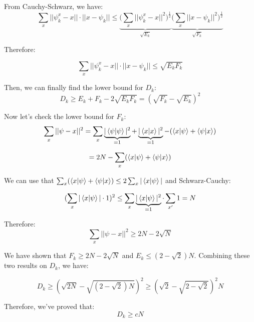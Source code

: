 From Cauchy-Schwarz, we have:
\begin{equation}
    \sum_x || \psi_k^x - x || \cdot || x - \psi_k || \leq \underbrace{\bigg( \sum_x || \psi_k^x - x||^2 \bigg)^{\frac{1}{2}}}_{\sqrt{E_k}} \underbrace{\bigg( \sum_x || x - \psi_k ||^2 \bigg)^{\frac{1}{2}}}_{\sqrt{F_k}}
\end{equation}

Therefore: 

\begin{equation}
    \sum_x || \psi_k^x - x || \cdot || x - \psi_k || \leq \sqrt{E_k F_k}
\end{equation}

Then, we can finally find the lower bound for $D_k$:
\begin{equation}
    D_k \geq E_k + F_k - 2 \sqrt{E_k F_k} = (\sqrt{F_k} - \sqrt{E_k})^2
\end{equation}

Now let's check the lower bound for $F_k$:
\begin{equation}
    \sum_x|| \psi - x ||^2 = \sum_x \underbrace{|\left\langle{\psi}\middle\vert{\psi}\right\rangle|^2}_{=1} + \underbrace{|\left\langle{x}\middle\vert{x}\right\rangle|^2}_{=1} - ( \left\langle{x}\middle\vert{\psi}\right\rangle + \left\langle{\psi}\middle\vert{x}\right\rangle)
\end{equation}

\begin{equation}
    = 2N - \sum_x ( \left\langle{x}\middle\vert{\psi}\right\rangle + \left\langle{\psi}\middle\vert{x}\right\rangle)
\end{equation}

We can use that $\sum_x ( \left\langle{x}\middle\vert{\psi}\right\rangle + \left\langle{\psi}\middle\vert{x}\right\rangle) \leq 2 \sum_x |\left\langle{x}\middle\vert{\psi}\right\rangle|$ and Schwarz-Cauchy:

\begin{equation}
    (\sum_x |\left\langle{x}\middle\vert{\psi}\right\rangle| \cdot 1)^2 \leq \sum_x \underbrace{|\left\langle{x}\middle\vert{\psi}\right\rangle|^2}_{=1} \cdot \sum_{x'}1 = N
\end{equation}

Therefore:
\begin{equation}
    \sum_x || \psi - x ||^2 \geq 2N - 2 \sqrt{N}
\end{equation}

We have shown that $F_k \geq 2N - 2\sqrt{N}$ and $E_k \leq (2 - \sqrt{2}) N$. Combining these two results on $D_k$, we have:

\begin{equation}
    D_k \geq ( \sqrt{2N} - \sqrt{(2 - \sqrt{2})N} )^2 \geq ( \sqrt{2} - \sqrt{2 - \sqrt{2}})^2 N
\end{equation}

Therefore, we've proved that:
\begin{equation}
    D_k \geq c N
\end{equation}

